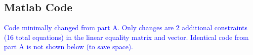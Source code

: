 \documentclass[../report/main.tex]{subfiles}
\begin{document}
\subsection*{ Matlab Code}
\textcolor{blue}{Code minimally changed from part A.  Only changes are 2 additional constraints (16 total equations) in the linear equality matrix and vector.  Identical code from part A is not shown below (to save space).}

\end{document}
